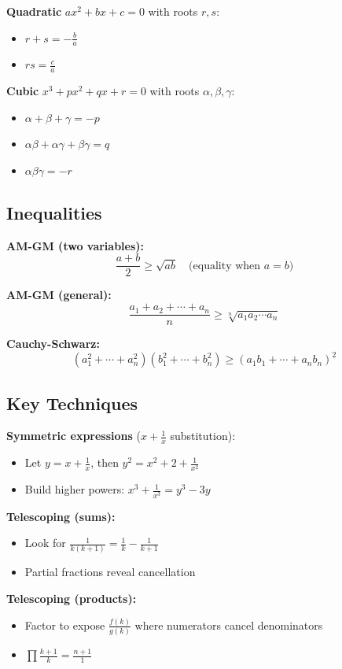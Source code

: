 \documentclass[12pt]{extarticle}
\begin{document}
\textbf{Quadratic} $ax^2 + bx + c = 0$ with roots $r, s$:
\begin{itemize}
    \item $r + s = -\frac{b}{a}$
    \item $rs = \frac{c}{a}$
\end{itemize}

\textbf{Cubic} $x^3 + px^2 + qx + r = 0$ with roots $\alpha, \beta, \gamma$:
\begin{itemize}
    \item $\alpha + \beta + \gamma = -p$
    \item $\alpha\beta + \alpha\gamma + \beta\gamma = q$
    \item $\alpha\beta\gamma = -r$
\end{itemize}

\subsection*{Inequalities}

\textbf{AM-GM (two variables):}
\[
\frac{a+b}{2} \ge \sqrt{ab} \quad \text{(equality when $a=b$)}
\]

\textbf{AM-GM (general):}
\[
\frac{a_1 + a_2 + \cdots + a_n}{n} \ge \sqrt[n]{a_1 a_2 \cdots a_n}
\]

\textbf{Cauchy-Schwarz:}
\[
(a_1^2 + \cdots + a_n^2)(b_1^2 + \cdots + b_n^2) \ge (a_1b_1 + \cdots + a_nb_n)^2
\]

\subsection*{Key Techniques}

\textbf{Symmetric expressions} ($x + \frac{1}{x}$ substitution):
\begin{itemize}
    \item Let $y = x + \frac{1}{x}$, then $y^2 = x^2 + 2 + \frac{1}{x^2}$
    \item Build higher powers: $x^3 + \frac{1}{x^3} = y^3 - 3y$
\end{itemize}

\textbf{Telescoping (sums):}
\begin{itemize}
    \item Look for $\frac{1}{k(k+1)} = \frac{1}{k} - \frac{1}{k+1}$
    \item Partial fractions reveal cancellation
\end{itemize}

\textbf{Telescoping (products):}
\begin{itemize}
    \item Factor to expose $\frac{f(k)}{g(k)}$ where numerators cancel denominators
    \item $\prod \frac{k+1}{k} = \frac{n+1}{1}$
\end{itemize}
\end{document}
